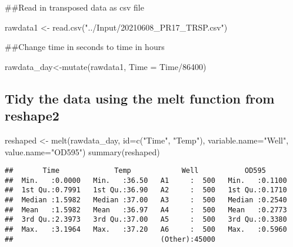 \documentclass[
]{article}
\newenvironment{Shaded}{\begin{snugshade}}{\end{snugshade}}
\newcommand{\AttributeTok}[1]{\textcolor[rgb]{0.77,0.63,0.00}{#1}}
\newcommand{\DecValTok}[1]{\textcolor[rgb]{0.00,0.00,0.81}{#1}}
\newcommand{\FunctionTok}[1]{\textcolor[rgb]{0.00,0.00,0.00}{#1}}
\newcommand{\NormalTok}[1]{#1}
\newcommand{\OtherTok}[1]{\textcolor[rgb]{0.56,0.35,0.01}{#1}}
\newcommand{\SpecialCharTok}[1]{\textcolor[rgb]{0.00,0.00,0.00}{#1}}
\newcommand{\StringTok}[1]{\textcolor[rgb]{0.31,0.60,0.02}{#1}}
\begin{document}
\#\#Read in transposed data as csv file

\begin{Shaded}
\begin{Highlighting}[]
\NormalTok{rawdata1 }\OtherTok{\textless{}{-}} \FunctionTok{read.csv}\NormalTok{(}\StringTok{"../Input/20210608\_PR17\_TRSP.csv"}\NormalTok{)}
\end{Highlighting}
\end{Shaded}

\#\#Change time in seconds to time in hours

\begin{Shaded}
\begin{Highlighting}[]
\NormalTok{rawdata\_day}\OtherTok{\textless{}{-}}\FunctionTok{mutate}\NormalTok{(rawdata1, }\AttributeTok{Time =}\NormalTok{ Time}\SpecialCharTok{/}\DecValTok{86400}\NormalTok{)}
\end{Highlighting}
\end{Shaded}

\hypertarget{tidy-the-data-using-the-melt-function-from-reshape2}{%
\subsection{Tidy the data using the melt function from
reshape2}\label{tidy-the-data-using-the-melt-function-from-reshape2}}

\begin{Shaded}
\begin{Highlighting}[]
\NormalTok{reshaped }\OtherTok{\textless{}{-}} \FunctionTok{melt}\NormalTok{(rawdata\_day, }\AttributeTok{id=}\FunctionTok{c}\NormalTok{(}\StringTok{"Time"}\NormalTok{, }\StringTok{"Temp"}\NormalTok{), }\AttributeTok{variable.name=}\StringTok{"Well"}\NormalTok{,}
                 \AttributeTok{value.name=}\StringTok{"OD595"}\NormalTok{)}
\FunctionTok{summary}\NormalTok{(reshaped)}
\end{Highlighting}
\end{Shaded}

\begin{verbatim}
##       Time             Temp            Well           OD595       
##  Min.   :0.0000   Min.   :36.50   A1     :  500   Min.   :0.1100  
##  1st Qu.:0.7991   1st Qu.:36.90   A2     :  500   1st Qu.:0.1710  
##  Median :1.5982   Median :37.00   A3     :  500   Median :0.2540  
##  Mean   :1.5982   Mean   :36.97   A4     :  500   Mean   :0.2773  
##  3rd Qu.:2.3973   3rd Qu.:37.00   A5     :  500   3rd Qu.:0.3380  
##  Max.   :3.1964   Max.   :37.20   A6     :  500   Max.   :0.5960  
##                                   (Other):45000
\end{verbatim}
\end{document}
